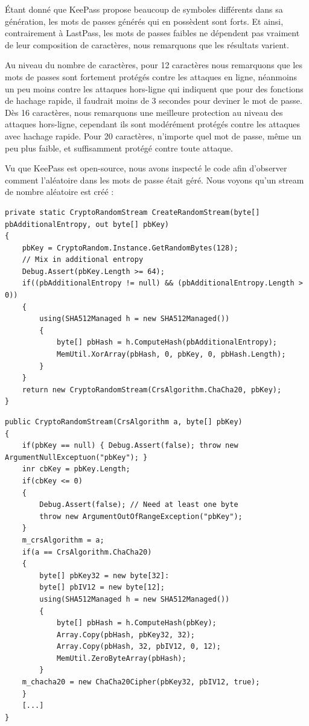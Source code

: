 Étant donné que KeePass propose beaucoup de symboles différents dans sa génération, les mots de passes générés qui en possèdent sont forts. Et ainsi, contrairement à LastPass, les mots de passes faibles ne dépendent pas vraiment de leur composition de caractères, nous remarquons que les résultats varient. 

Au niveau du nombre de caractères, pour 12 caractères nous remarquons que les mots de passes sont fortement protégés contre les attaques en ligne, néanmoins un peu moins contre les attaques hors-ligne qui indiquent que pour des fonctions de hachage rapide, il faudrait moins de 3 secondes pour deviner le mot de passe. Dès 16 caractères, nous remarquons une meilleure protection au niveau des attaques hors-ligne, cependant ils sont modérément protégés contre les attaques avec hachage rapide. Pour 20 caractères, n'importe quel mot de passe, même un peu plus faible, et suffisamment protégé contre toute attaque.

Vu que KeePass est open-source, nous avons inspecté le code afin d'observer comment l'aléatoire dans les mots de passe était géré. Nous voyons qu'un stream de nombre aléatoire est créé :

\begin{lstlisting}[style=c, caption=Fonction \textit{CreateRandomStream} de KeePass]
private static CryptoRandomStream CreateRandomStream(byte[] pbAdditionalEntropy, out byte[] pbKey)
{
	pbKey = CryptoRandom.Instance.GetRandomBytes(128);
	// Mix in additional entropy
	Debug.Assert(pbKey.Length >= 64);
	if((pbAdditionalEntropy != null) && (pbAdditionalEntropy.Length > 0))
	{
		using(SHA512Managed h = new SHA512Managed())
		{
			byte[] pbHash = h.ComputeHash(pbAdditionalEntropy);
			MemUtil.XorArray(pbHash, 0, pbKey, 0, pbHash.Length);
		}
	}
	return new CryptoRandomStream(CrsAlgorithm.ChaCha20, pbKey);
}
\end{lstlisting}

\begin{lstlisting}[style=c, caption=Constructeur \textit{CryptoRandomStream} de KeePass]
public CryptoRandomStream(CrsAlgorithm a, byte[] pbKey)
{
	if(pbKey == null) { Debug.Assert(false); throw new ArgumentNullExceptuon("pbKey"); }
	inr cbKey = pbKey.Length;
	if(cbKey <= 0) 
	{
		Debug.Assert(false); // Need at least one byte
		throw new ArgumentOutOfRangeException("pbKey");
	}
	m_crsAlgorithm = a;
	if(a == CrsAlgorithm.ChaCha20)
	{
		byte[] pbKey32 = new byte[32]:
		byte[] pbIV12 = new byte[12];
		using(SHA512Managed h = new SHA512Managed())
		{
			byte[] pbHash = h.ComputeHash(pbKey);
			Array.Copy(pbHash, pbKey32, 32);
			Array.Copy(pbHash, 32, pbIV12, 0, 12);
			MemUtil.ZeroByteArray(pbHash);
		}
	m_chacha20 = new ChaCha20Cipher(pbKey32, pbIV12, true);
	}
	[...]
}
\end{lstlisting}

